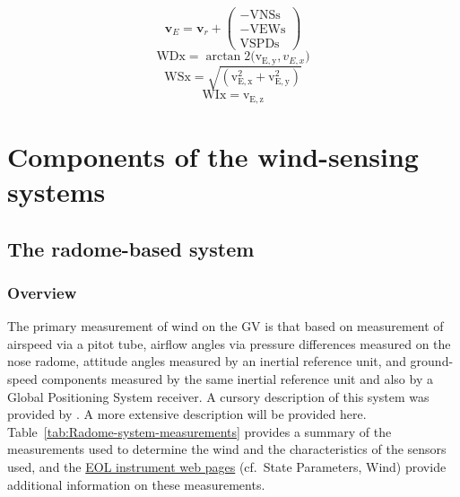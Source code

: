 \documentclass[12pt,twoside,english]{article}\usepackage[]{graphicx}\usepackage[]{color}
\let\stdsection\section
\renewcommand{\section}{\newpage\stdsection}
\let\OrgIndex\index
\renewcommand*{\index}[1]{\OrgIndex{#1}}
\begin{document}
\begin{equation}
\mathbf{v}_{E}=\mathbf{v}_{r}+\left(\begin{array}{c}
-\mathrm{VNSs}\\ -\mathrm{VEWs}\\ 
\mathrm{VSPDs}
\end{array}\right)\label{eq:vg}
\end{equation}
\begin{equation}
\mathrm{WDx=\arctan2(v_{E,y},}v_{E,x})\label{eq:wd}
\end{equation}
\begin{equation}
\mathrm{WSx=\sqrt{(v_{E,x}^{2}+v_{E,y}^{2})}}\label{eq:ws}
\end{equation}
\begin{equation}
\mathrm{WIx=v_{E,z}}\label{eq:wi}
\end{equation}




\section{Components of the wind-sensing systems\label{sec:Components}}

\subsection{The radome-based system\label{sub:The-radome-based-system}}


\subsubsection{Overview}

The primary measurement of wind on the GV  is that based on measurement of airspeed via a pitot tube, airflow angles via pressure differences measured on the nose radome, attitude angles measured by an inertial reference unit, and ground-speed components measured by the same inertial reference unit and also by a Global Positioning System receiver. A cursory description of this system was provided by \citet{CooperEtAl2014}. A more extensive description will be provided here. Table~\ref{tab:Radome-system-measurements} provides a summary of the measurements used to determine the wind and the characteristics of the sensors used, and the \href{http://www.eol.ucar.edu/aircraft-instrumentation}{EOL instrument web pages} (cf.~\textquotedbl{}State Parameters\textquotedbl{}, \textquotedbl{}Wind\textquotedbl{}) provide additional information on these measurements.  
\end{document}
